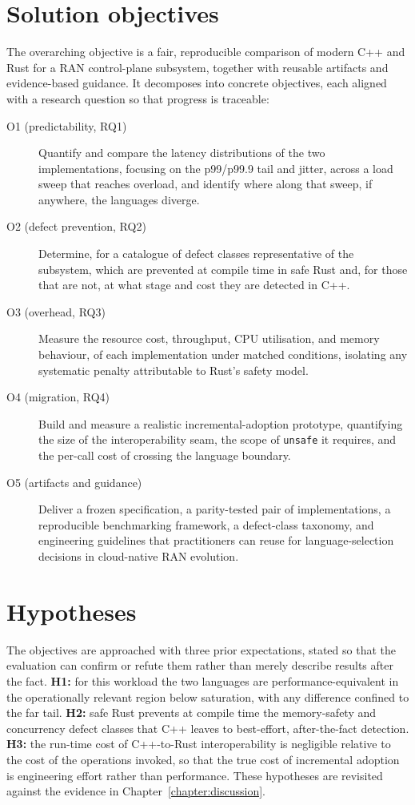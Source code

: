\documentclass[english,twoside,openright,a4paper,censored,csm,software-track-2020]{HYthesisML}
\begin{document}
\section{Solution objectives}
The overarching objective is a fair, reproducible comparison of modern C++ and Rust for a RAN
control-plane subsystem, together with reusable artifacts and evidence-based guidance. It
decomposes into concrete objectives, each aligned with a research question so that progress is
traceable:

\begin{description}
  \item[O1 (predictability, RQ1)] Quantify and compare the latency distributions of the two
        implementations, focusing on the p99/p99.9 tail and jitter, across a load sweep that
        reaches overload, and identify where along that sweep, if anywhere, the languages
        diverge.
  \item[O2 (defect prevention, RQ2)] Determine, for a catalogue of defect classes
        representative of the subsystem, which are prevented at compile time in safe Rust and,
        for those that are not, at what stage and cost they are detected in C++.
  \item[O3 (overhead, RQ3)] Measure the resource cost, throughput, CPU utilisation, and memory
        behaviour, of each implementation under matched conditions, isolating any systematic
        penalty attributable to Rust's safety model.
  \item[O4 (migration, RQ4)] Build and measure a realistic incremental-adoption prototype,
        quantifying the size of the interoperability seam, the scope of \texttt{unsafe} it
        requires, and the per-call cost of crossing the language boundary.
  \item[O5 (artifacts and guidance)] Deliver a frozen specification, a parity-tested pair of
        implementations, a reproducible benchmarking framework, a defect-class taxonomy, and
        engineering guidelines that practitioners can reuse for language-selection decisions in
        cloud-native RAN evolution.
\end{description}

\section{Hypotheses}
The objectives are approached with three prior expectations, stated so that the evaluation can
confirm or refute them rather than merely describe results after the fact. \textbf{H1:} for
this workload the two languages are performance-equivalent in the operationally relevant region
below saturation, with any difference confined to the far tail. \textbf{H2:} safe Rust prevents
at compile time the memory-safety and concurrency defect classes that C++ leaves to
best-effort, after-the-fact detection. \textbf{H3:} the run-time cost of C++-to-Rust
interoperability is negligible relative to the cost of the operations invoked, so that the true
cost of incremental adoption is engineering effort rather than performance. These hypotheses are
revisited against the evidence in Chapter~\ref{chapter:discussion}.
\end{document}
